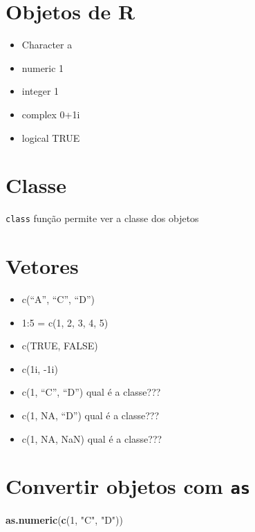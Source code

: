 \documentclass[]{book}
\newenvironment{Shaded}{\begin{snugshade}}{\end{snugshade}}
\newcommand{\KeywordTok}[1]{\textcolor[rgb]{0.13,0.29,0.53}{\textbf{#1}}}
\newcommand{\DecValTok}[1]{\textcolor[rgb]{0.00,0.00,0.81}{#1}}
\newcommand{\StringTok}[1]{\textcolor[rgb]{0.31,0.60,0.02}{#1}}
\newcommand{\NormalTok}[1]{#1}
\providecommand{\tightlist}{%
  \setlength{\itemsep}{0pt}\setlength{\parskip}{0pt}}
\begin{document}
\section{Objetos de R}\label{objetos-de-r}

\begin{itemize}
\tightlist
\item
  Character a
\item
  numeric 1
\item
  integer 1
\item
  complex 0+1i
\item
  logical TRUE
\end{itemize}

\section{Classe}\label{classe}

\texttt{class} função permite ver a classe dos objetos

\section{Vetores}\label{vetores}

\begin{itemize}
\tightlist
\item
  c(``A'', ``C'', ``D'')
\item
  1:5 = c(1, 2, 3, 4, 5)
\item
  c(TRUE, FALSE)
\item
  c(1i, -1i)
\item
  c(1, ``C'', ``D'') qual é a classe???
\item
  c(1, NA, ``D'') qual é a classe???
\item
  c(1, NA, NaN) qual é a classe???
\end{itemize}

\section{\texorpdfstring{Convertir objetos com
\texttt{as}}{Convertir objetos com as}}\label{convertir-objetos-com-as}

\begin{Shaded}
\begin{Highlighting}[]
\KeywordTok{as.numeric}\NormalTok{(}\KeywordTok{c}\NormalTok{(}\DecValTok{1}\NormalTok{, }\StringTok{"C"}\NormalTok{, }\StringTok{"D"}\NormalTok{))}
\end{Highlighting}
\end{Shaded}
\end{document}
